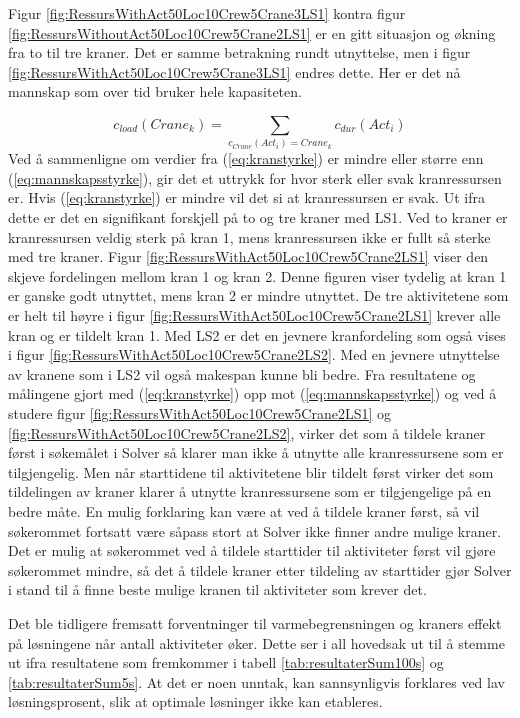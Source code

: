 Figur \ref{fig:RessursWithAct50Loc10Crew5Crane3LS1} kontra figur \ref{fig:RessursWithoutAct50Loc10Crew5Crane2LS1} er en gitt situasjon og økning fra to til tre kraner. Det er samme betrakning rundt utnyttelse, men i figur \ref{fig:RessursWithAct50Loc10Crew5Crane3LS1} endres dette. Her er det nå mannskap som over tid bruker hele kapasiteten.

\begin{equation}
c_{load}(Crane_{k}) = \sum_{c_{Crane}(Act_{i})=Crane_{k}} c_{dur}(Act_{i})
\label{eq:kranstyrke}
\end{equation}
Ved å sammenligne om verdier fra (\ref{eq:kranstyrke}) er mindre eller større enn (\ref{eq:mannskapsstyrke}), gir det et uttrykk for hvor sterk eller svak kranressursen er. Hvis (\ref{eq:kranstyrke}) er mindre vil det si at kranressursen er svak. Ut ifra dette er det en signifikant forskjell på to og tre kraner med LS1. Ved to kraner er kranressursen veldig sterk på kran 1, mens kranressursen ikke er fullt så sterke med tre kraner. Figur \ref{fig:RessursWithAct50Loc10Crew5Crane2LS1} viser den skjeve fordelingen mellom kran 1 og kran 2. Denne figuren viser tydelig at kran 1 er ganske godt utnyttet, mens kran 2 er mindre utnyttet. De tre aktivitetene som er helt til høyre i figur \ref{fig:RessursWithAct50Loc10Crew5Crane2LS1} krever alle kran og er tildelt kran 1. Med LS2 er det en jevnere kranfordeling som også vises i figur \ref{fig:RessursWithAct50Loc10Crew5Crane2LS2}. Med en jevnere utnyttelse av kranene som i LS2 vil også makespan kunne bli bedre. Fra resultatene og målingene gjort med (\ref{eq:kranstyrke}) opp mot (\ref{eq:mannskapsstyrke}) og ved å studere figur \ref{fig:RessursWithAct50Loc10Crew5Crane2LS1} og \ref{fig:RessursWithAct50Loc10Crew5Crane2LS2}, virker det som å tildele kraner først i søkemålet i Solver så klarer man ikke å utnytte alle kranressursene som er tilgjengelig. Men når starttidene til aktivitetene blir tildelt først virker det som tildelingen av kraner klarer å utnytte kranressursene som er tilgjengelige på en bedre måte. En mulig forklaring kan være at ved å tildele kraner først, så vil søkerommet fortsatt være såpass stort at Solver ikke finner andre mulige kraner. Det er mulig at søkerommet ved å tildele starttider til aktiviteter først vil gjøre søkerommet mindre, så det å tildele kraner etter tildeling av starttider gjør Solver i stand til å finne beste mulige kranen til aktiviteter som krever det.

Det ble tidligere fremsatt forventninger til varmebegrensningen og kraners effekt på løsningene når antall aktiviteter øker. Dette ser i all hovedsak ut til å stemme ut ifra resultatene som fremkommer i tabell \ref{tab:resultaterSum100s} og \ref{tab:resultaterSum5s}. At det er noen unntak, kan sannsynligvis forklares ved lav løsningsprosent, slik at optimale løsninger ikke kan etableres.

